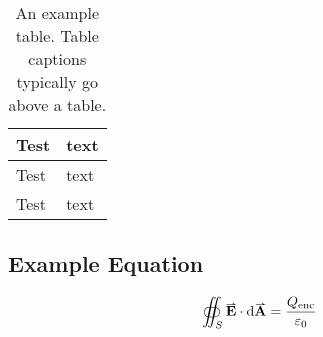 \documentclass[a4paper, 12pt, english]{article}
\begin{document}
            \begin{table}[!h]
                \centering
                \caption{An example table. Table captions typically go above a table.}
                \label{table: example}
                \begin{tabular}{ |C{0.2\textwidth}|m{0.2\textwidth}| }
                    \hline
                    Test & text\\
                    \hline
                    \hline
                    Test & text\\
                    \hline
                    Test & text\\
                    \hline
                \end{tabular}
            \end{table}

        \subsection{Example Equation}
            \label{app: example equation}

            \begin{equation}
                \oiint_S \vect{E} \cdot \d\vect{A} = \frac{Q_{\text{enc}}}{\varepsilon_0}
                \label{eq: Gauss Law}
            \end{equation}


            
            
\end{document}
